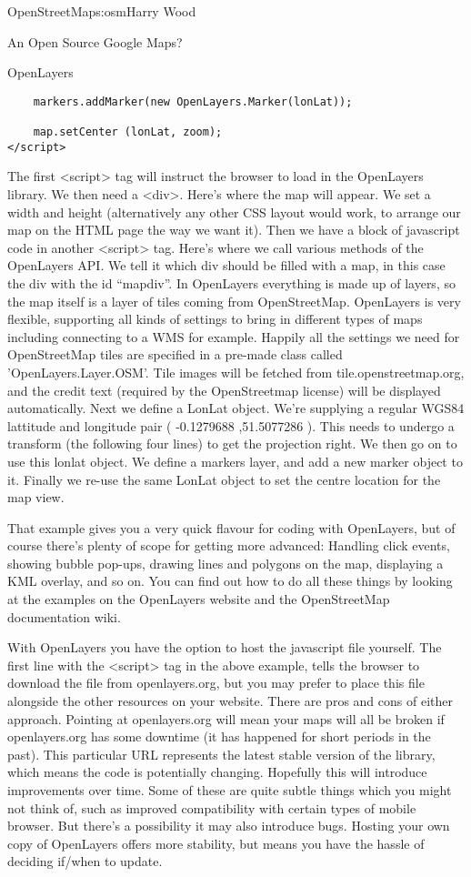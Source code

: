 \begin{aosachapter}{OpenStreetMap}{s:osm}{Harry Wood}
\begin{aosasect1}{An Open Source Google Maps?}
\begin{aosasect2}{OpenLayers}
\begin{verbatim}
    markers.addMarker(new OpenLayers.Marker(lonLat));

    map.setCenter (lonLat, zoom);
</script>
\end{verbatim}

The first <script> tag will instruct the browser to load in the
OpenLayers library. We then need a <div>. Here's where the map will
 appear. We set a width and height (alternatively any other CSS layout
 would work, to arrange our map on the HTML page the way we want
 it). Then we have a block of javascript code in another <script>
 tag. Here's where we call various methods of the OpenLayers API. We
 tell it which div should be filled with a map, in this case the div
 with the id ``mapdiv''. In OpenLayers everything is made up of
 layers, so the map itself is a layer of tiles coming from
 OpenStreetMap. OpenLayers is very flexible, supporting all kinds of
 settings to bring in different types of maps including connecting to
 a WMS for example. Happily all the settings we need for OpenStreetMap
 tiles are specified in a pre-made class called
 'OpenLayers.Layer.OSM'. Tile images will be fetched from
 tile.openstreetmap.org, and the credit text (required by the
 OpenStreetmap license) will be displayed automatically. Next we
 define a LonLat object. We're supplying a regular WGS84 lattitude and
 longitude pair ( -0.1279688 ,51.5077286 ). This needs to undergo a
 transform (the following four lines) to get the projection right. We
 then go on to use this lonlat object. We define a markers layer, and
 add a new marker object to it. Finally we re-use the same LonLat
 object to set the centre location for the map view.

That example gives you a very quick flavour for coding with
OpenLayers, but of course there's plenty of scope for getting more
advanced: Handling click events, showing bubble pop-ups, drawing lines
and polygons on the map, displaying a KML overlay, and so on. You can
find out how to do all these things by looking at the examples on the
OpenLayers website and the OpenStreetMap documentation wiki.

With OpenLayers you have the option to host the javascript file
yourself. The first line with the <script> tag in the above example,
tells the browser to download the file from openlayers.org, but you
may prefer to place this file alongside the other resources on your
website. There are pros and cons of either approach. Pointing at
openlayers.org will mean your maps will all be broken if
openlayers.org has some downtime (it has happened for short periods in
the past). This particular URL represents the latest stable version of
the library, which means the code is potentially changing. Hopefully
this will introduce improvements over time. Some of these are quite
subtle things which you might not think of, such as improved
compatibility with certain types of mobile browser. But there's a
possibility it may also introduce bugs. Hosting your own copy of
OpenLayers offers more stability, but means you have the hassle of
deciding if/when to update.


\end{aosasect2}
\end{aosasect1}
\end{aosachapter}
